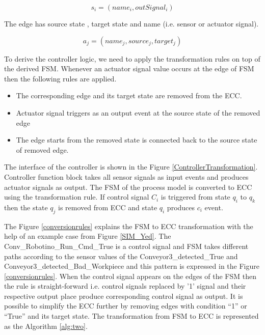 \begin{bibunit}
  \begin{equation}\label{eqn:2}
    s_i = (name_i, outSignal_i ) 
  \end{equation}
 
 The edge has source state , target state and name (i.e. sensor or actuator signal).
 
   \begin{equation}\label{eqn:3}
     a_j = (name_j, source_j, target_j)
  \end{equation}
 
 To derive the controller logic, we need to apply the transformation rules on top of the derived FSM. Whenever an actuator signal value occurs at the edge of FSM then the following rules are applied.


\begin{itemize}
  \item The corresponding edge and its target state are removed from the ECC.
  \item  Actuator signal triggers as an output event at the source state of the removed edge
  \item The edge starts from the removed state  is connected back to the source state of removed edge.
\end{itemize}


The interface of the controller is shown in the Figure \ref{ControllerTransformation}. Controller function block takes all sensor signals as input events and  produces actuator signals as output. The FSM of the process model is converted to ECC using the transformation rule. If control signal $C_i$ is triggered from state $q_i$ to $q_k$ then the  state $q_j$ is removed  from ECC  and state $q_i$ produces $c_i$ event. 


The Figure \ref{conversionrules} explains the FSM to ECC transformation with the help of an example case from Figure \ref{SIM_Yed}.  The Conv\_Robotino\_Run\_Cmd\_True is a control signal and FSM takes different paths according to the sensor values of the Conveyor3\_detected\_True and Conveyor3\_detected\_Bad\_Workpiece and this pattern is expressed in the Figure \ref{conversionrules}. When the control signal appears on the edges of the FSM  then the rule is straight-forward i.e. control signals replaced by '1' signal and their respective output place produce corresponding control signal as output. It is possible to simplify the ECC further  by removing edges with condition  “1” or “True” and its target state. The transformation from FSM to ECC is represented as the Algorithm \ref{alg:two}.




\end{bibunit}

